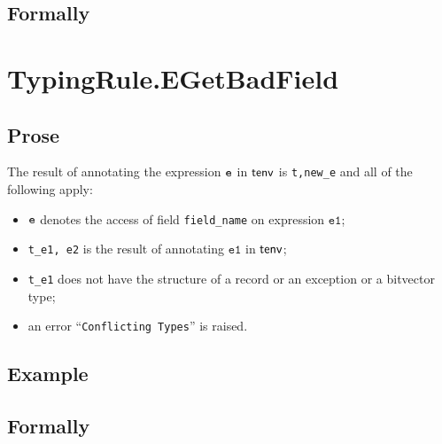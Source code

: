 \documentclass{book}
\newcommand\veone[0]{\texttt{e1}}
\begin{document}
\begin{emptyformal}
    \subsection{Formally}

\end{emptyformal}


\section{TypingRule.EGetBadField \label{sec:TypingRule.EGetBadField}}

 \subsection{Prose}
  The result of annotating the expression $\texttt{e}$ in $\textsf{tenv}$ is
\texttt{t,new\_e} and all of the following apply:
   \begin{itemize}
   \item $\texttt{e}$ denotes the access of field \texttt{field\_name} on expression $\veone$;
   \item \texttt{t\_e1, e2} is the result of annotating $\veone$ in $\textsf{tenv}$;
   \item \texttt{t\_e1} does not have the structure of a record or an exception or a bitvector type;
   \item an error ``\texttt{Conflicting Types}'' is raised.
   \end{itemize}

 \subsection{Example}



\begin{emptyformal}
    \subsection{Formally}

\end{emptyformal}

\end{document}

